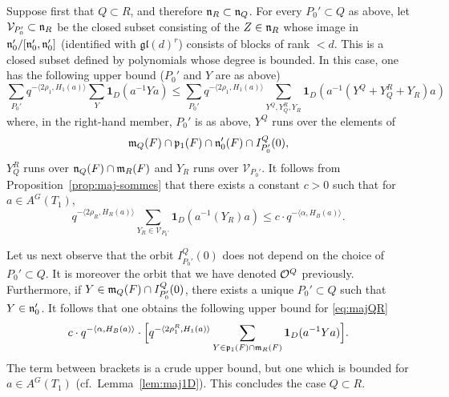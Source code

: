 \begin{paragr}
\begin{preuve}
Suppose first that $Q\subset R$, and therefore $\mathfrak{n}_R\subset \mathfrak{n}_Q$. For every $P_0'\subset Q$ as above, let $\mathcal{V}_{P_0'}\subset \mathfrak{n}_R$ be the closed subset consisting of the $Z\in \mathfrak{n}_R$ whose image in $\mathfrak{n}_0'/[\mathfrak{n}_0',\mathfrak{n}_0']$ (identified with $\mathfrak{gl}(d)^r$) consists of \og blocks\fg{} of rank $<d$. This is a closed subset defined by polynomials whose degree is bounded. In this case, one has the following upper bound ($P_0'$ and $Y$ are as above)
\begin{equation}
  \label{eq:majQR}
  \sum_{P_0'} q^{-\langle 2\rho_1,H_1(a)\rangle}\sum_Y \mathbf{1}_D(a^{-1}Ya)\leq \sum_{P_0'} q^{-\langle 2\rho_1,H_1(a)\rangle}\sum_{Y^Q,Y^R_Q,Y_R} \mathbf{1}_D(a^{-1}(Y^Q+Y^R_Q+Y_R)a)
\end{equation}
where, in the right-hand member, $P_0'$ is as above, $Y^Q$ runs over the elements of
$$\mathfrak{m}_Q(F)\cap \mathfrak{p}_1(F)\cap \mathfrak{n}_0'(F)\cap I^Q_{P_0'}(0),$$
$Y^R_Q$ runs over $\mathfrak{n}_Q(F)\cap \mathfrak{m}_R(F)$ and $Y_R$ runs over $\mathcal{V}_{P_0'}$. It follows from Proposition~\ref{prop:maj-sommes} that there exists a constant $c>0$ such that for $a\in A^G(T_1)$,
$$q^{-\langle 2\rho_R,H_R(a)\rangle}\sum_{Y_R\in \mathcal{V}_{P_0'}} \mathbf{1}_D(a^{-1}(Y_R)a)\leq c\cdot q^{-\langle \alpha,H_B(a)\rangle}.$$

Let us next observe that the orbit $I^Q_{P_0'}(0)$ does not depend on the choice of $P_0'\subset Q$. It is moreover the orbit that we have denoted $\mathcal{O}^Q$ previously. Furthermore, if $Y\in \mathfrak{m}_Q(F)\cap I^Q_{P_0'}(0)$, there exists a unique $P_0'\subset Q$ such that $Y\in \mathfrak{n}_0'$. It follows that one obtains the following upper bound for \eqref{eq:majQR}
$$c\cdot q^{-\langle \alpha,H_B(a)\rangle}\cdot \Bigl[q^{-\langle 2\rho_1^R,H_1(a)\rangle}\sum_{Y\in \mathfrak{p}_1(F)\cap \mathfrak{m}_R(F)} \mathbf{1}_D(a^{-1}Ya)\Bigr].$$
The term between brackets is a crude upper bound, but one which is bounded for $a\in A^G(T_1)$ (cf.\ Lemma~\ref{lem:maj1D}). This concludes the case $Q\subset R$.


\end{preuve}
\end{paragr}
